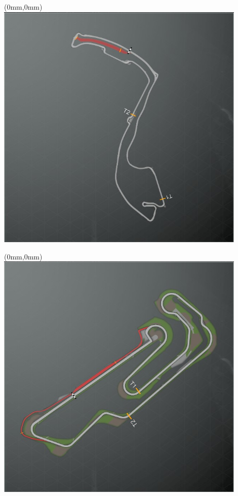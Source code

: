 \null\newpage
\begin{textblock*}{30mm}(0mm,0mm)%
\includegraphics[width=120mm]{TR/2015-05-20_00001.png}
\end{textblock*}
\null\newpage
\begin{textblock*}{30mm}(0mm,0mm)%
\includegraphics[width=120mm]{TR/2015-05-20_00045.png}
\end{textblock*}
